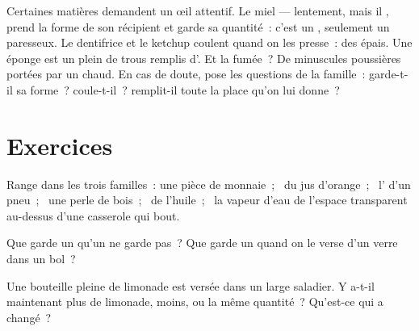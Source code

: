 \begin{remark}\label{rem:g3:solids-liquids-gases:tricky}
Certaines matières demandent un œil attentif. Le miel  ---
lentement, mais il , prend la forme de son récipient et garde sa
quantité~: c'est un , seulement un  paresseux. Le
dentifrice et le ketchup coulent quand on les presse~: des 
épais. Une éponge est un  plein de trous remplis d'. Et la
fumée~? De minuscules poussières  portées par un  chaud. En
cas de doute, pose les questions de la famille~: garde-t-il sa
forme~? coule-t-il~? remplit-il toute la place qu'on lui donne~?
\end{remark}

\section{Exercices}

\begin{exercise}[$\star$]\label{exo:g3:solids-liquids-gases:1}
Range dans les trois familles~: une pièce de monnaie~; \ du jus
d'orange~; \ l' d'un pneu~; \ une perle de bois~; \ de l'huile~; \ la
vapeur d'eau de l'espace transparent au-dessus d'une casserole qui
bout.
\end{exercise}

\begin{exercise}[$\star$]\label{exo:g3:solids-liquids-gases:2}
Que garde un  qu'un  ne garde pas~? Que garde un 
quand on le verse d'un verre dans un bol~?
\end{exercise}

\begin{exercise}[$\star$]\label{exo:g3:solids-liquids-gases:3}
Une bouteille pleine de limonade est versée dans un large saladier.
Y a-t-il maintenant plus de limonade, moins, ou la même quantité~?
Qu'est-ce qui a changé~?
\end{exercise}

